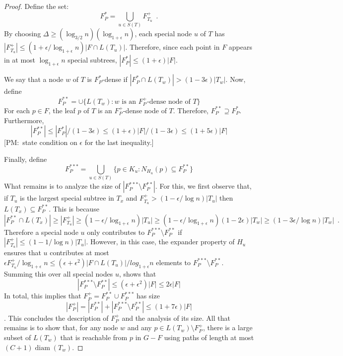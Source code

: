\documentclass{patmorin}
\newcommand{\note}[2]{{\color{red}[#1:~#2]}}
\DeclareMathOperator{\diam}{diam}
\begin{document}
\begin{proof}
  Define the set:
  \[  
    F^*_P = \bigcup_{u\in S(T)} F^+_{T_u} \enspace .
  \]
  By choosing $\Delta \ge (\log_{3/2} n)(\log_{1+\epsilon}
  n)$, each special node $u$ of $T$ has $|F^+_{T_u}|\le
  (1+\epsilon/\log_{1+\epsilon} n)|F\cap L(T_u)|$. Therefore, since
  each point in $F$ appears in at most $\log_{1+\epsilon} n$ special
  subtrees, $|F^*_P|\le (1+\epsilon)|F|$.

  We say that a node $w$ of $T$ is $F^*_P$-dense if $|F^*_P \cap L(T_w)| >
  (1-3\epsilon)|T_w|$.  Now, define
  \[  
     F^{**}_P = \cup\{ L(T_w) : \text{$w$ is an $F^+_P$-dense node of $T$} \}
  \]
  For each $p\in F$, the leaf $p$ of $T$ is an $F^+_P$-dense node of
  $T$. Therefore, $F^{**}_P\supseteq F^{*}_P$.  Furthermore,
  \[
      |F^{**}_P| \le |F^*_P|/(1-3\epsilon) \le (1+\epsilon)|F|/(1-3\epsilon) \le (1+5\epsilon)|F|
  \]
  \note{PM}{state condition on $\epsilon$ for the last inequality.}

  Finally, define 
  \[  F^{***}_P = \bigcup_{u\in S(T)} \{p \in K_u : N_{H_u}(p)\subseteq F^{**}_P \} \]
  What remains is to analyze the size of $|F^{***}_P\setminus F^{**}_P|$.
  For this, we first observe that, if $T_u$ is the largest special
  subtree in $T_x$ and $F^+_{T_u} > (1-\epsilon/\log n)|T_u|$ then
  $L(T_x)\subseteq F^{**}_P$.  This is because
  \[
     |F^{**}_P\cap L(T_x)| 
  \ge  
     |F^+_{T_u}|
  \ge  
     (1-\epsilon/\log_{1+\epsilon} n)|T_u|
  \ge  
     (1-\epsilon/\log_{1+\epsilon} n)(1-2\epsilon)|T_w|
  \ge  
     (1-3\epsilon/\log n)|T_w| \enspace .
  \]
  Therefore a special node $u$ only contributes to $F^{***}_P\setminus
  F^{**}_P$ if $|F^+_{T_u}| \le (1-1/\log n)|T_u|$.  However,
  in this case, the expander property of $H_u$ ensures that $u$
  contributes at most $\epsilon F^+_{T_u}/\log_{1+\epsilon} n\le
  (\epsilon+\epsilon^2)|F\cap L(T_u)|/log_{1+\epsilon} n$ elements to
  $F^{***}_P\setminus F^{**}_P$.  Summing this over all special nodes $u$,
  shows that
  \[
     |F^{***}_P\setminus F^{**}_P| \le (\epsilon+\epsilon^2)|F| \le 2\epsilon|F|
  \]
  In total, this implies that $F^+_P = F^{**}_P\cup F^{***}_P$ has size
  \[ |F^+_P| = |F^{**}_P| + |F^{***}_P\setminus F^{**}_P|\le (1+7\epsilon)|F| \].  This concludes the description of
  $F^+_P$ and the analysis of its size.  All that remains is to show that, for any node $w$ and any $p\in L(T_w)\setminus F^+_P$, there is a large subset of $L(T_w)$ that is reachable from $p$ in $G-F$ using paths of length at most $(C+1)\diam(T_w)$.


\end{proof}
\end{document}
